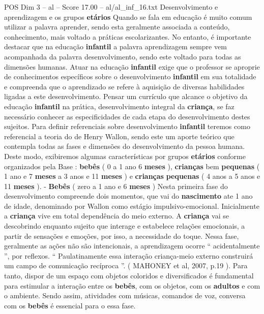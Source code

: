 \begin{textsample}{POS Dim 3 – al – Score 17.00 – al/al\_inf\_16.txt}  \label{ex:f3_pos_217}
Desenvolvimento e aprendizagem e os grupos \textbf{etários} Quando se fala em educação é muito comum utilizar a palavra aprender, sendo esta geralmente associada a conteúdo, conhecimento, mais voltado a práticas escolarizantes.
No entanto, é importante destacar que na educação \textbf{infantil} a palavra aprendizagem sempre vem acompanhada da palavra desenvolvimento, sendo este voltado para todas as dimensões humanas.
Atuar na educação \textbf{infantil} exige que o professor se aproprie de conhecimentos específicos sobre o desenvolvimento \textbf{infantil} em sua totalidade e compreenda que o aprendizado se refere à aquisição de diversas habilidades ligadas a este desenvolvimento.
Pensar um currículo que alcance o objetivo da educação \textbf{infantil} na prática, desenvolvimento integral da \textbf{criança}, se faz necessário conhecer as especificidades de cada etapa do desenvolvimento destes sujeitos.
Para definir referenciais sobre desenvolvimento \textbf{infantil} teremos como referencial a teoria do de Henry Wallon, sendo este um aporte teórico que contempla todas as fases e dimensões do desenvolvimento da pessoa humana.
Deste modo, exibiremos algumas características por grupos \textbf{etários} conforme organizados pela Base : \textbf{bebês} ( 0 a 1 ano 6 \textbf{meses} ), \textbf{crianças} bem \textbf{pequenas} ( 1 ano e 7 \textbf{meses} a 3 anos e 11 \textbf{meses} ) e \textbf{crianças} \textbf{pequenas} ( 4 anos a 5 anos e 11 \textbf{meses} ). - \textbf{Bebês} ( zero a 1 ano e 6 \textbf{meses} ) Nesta primeira fase do desenvolvimento compreende dois momentos, que vai do \textbf{nascimento} ate 1 ano de idade, denominado por Wallon como estágio impulsivo-emocional.
Inicialmente a \textbf{criança} vive em total dependência do meio externo.
A \textbf{criança} vai se descobrindo enquanto sujeito que interage e estabelece relações emocionais, a partir de sensações e emoções, por isso, a necessidade do toque.
Nessa fase, geralmente as ações não são intencionais, a aprendizagem ocorre “ acidentalmente ”, por reflexos. “ Paulatinamente essa interação criança-meio externo construirá um campo de comunicação recíproca ”. ( MAHONEY et al, 2007, p.19 ).
Para tanto, dispor de um espaço com objetos coloridos e diversificados é fundamental para estimular a interação entre os \textbf{bebês}, com os objetos, com os \textbf{adultos} e com o ambiente.
Sendo assim, atividades com músicas, comandos de voz, conversa com os \textbf{bebês} é essencial para o essa fase.

\end{textsample}
